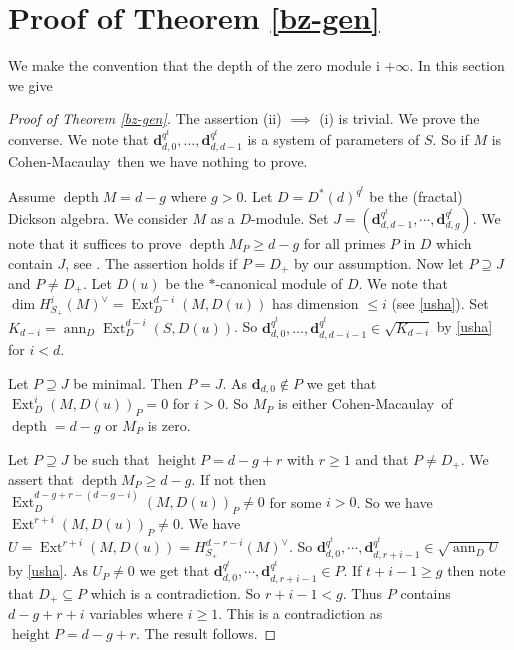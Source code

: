 \documentclass{amsart}
\newcommand{\CM}{Cohen-Macaulay}
\newcommand{\db}{\mathbf{d} }
\newcommand{\depth}{\operatorname{depth}}
\newcommand{\height}{\operatorname{height}}
\newcommand{\ann}{\operatorname{ann}}
\newcommand{\Ext}{\operatorname{Ext}}
\theoremstyle{plain}
\theoremstyle{definition}
\theoremstyle{remark}
\begin{document}
\section{Proof of Theorem \ref{bz-gen}}
We make the convention that the depth of the zero module i $+ \infty$.
In this section we give
\begin{proof}[Proof of Theorem \ref{bz-gen}]
The assertion (ii) $\implies $ (i) is trivial. We prove the converse.
We note that $\db_{d,0}^{q^t},\ldots, \db_{d, d-1}^{q^t}$ is a system of parameters of $S$. So if $M$ is \CM \ then
we have nothing to prove.

Assume $\depth M = d-g$ where $g > 0$. Let $D = D^*(d)^{q^t}$ be the (fractal) Dickson algebra. We consider $M$ as a $D$-module. Set $J =  (\db_{d,d-1}^{q^t}, \cdots, \db_{d,g}^{q^t})$. We note that it suffices to prove $\depth M_P \geq d -g$ for all primes $P$ in $D$ which contain $J$, see \cite[1.2.10]{BH}. The assertion holds if $P = D_+$ by our assumption. Now let $P \supseteq J$ and $P \neq D_+$. Let $D(u)$ be the $*$-canonical module of $D$.
We note that $\dim H^{i}_{S_+}(M)^\vee = \Ext^{d-i}_D(M, D(u))$ has dimension $\leq i$
 (see \ref{usha}).  Set $K_{d-i} = \ann_D \Ext^{d-i}_D(S, D(u))$. So
 $\db_{d,0}^{q^t}, \ldots, \db_{d, d-i-1}^{q^t} \in \sqrt{K_{d-i}}$ by \ref{usha} for $i < d$.

  Let $P \supseteq J$ be minimal. Then $P = J$. As $\db_{d, 0} \notin P$ we get that\\
  $\Ext^{i}_D(M, D(u))_P = 0$ for $i > 0$. So $M_P$ is either \CM \ of $\depth  = d -g$ or $M_P$ is  zero.

  Let $P \supseteq J$ be such that $\height P = d - g + r$ with $r \geq 1$ and that $P \neq D_+$. We assert that $\depth M_P \geq d- g$. If not then $\Ext^{d-g + r -(d -g -i)}_D(M, D(u))_P \neq 0$ for some $i > 0$. So we have $\Ext^{r+i}(M, D(u))_P \neq 0$. We have $U = \Ext^{r+i}(M, D(u)) = H^{d - r - i}_{S_+}(M)^\vee$. So $\db_{d,0}^{q^t}, \cdots, \db_{d, r + i -1}^{q^t} \in \sqrt{\ann_D U}$ by  \ref{usha}. As $U_P \neq 0$ we get that $\db_{d,0}^{q^t}, \cdots, \db_{d, r + i -1}^{q^t} \in P$. If $t+i -1 \geq g$ then note that $D_+ \subseteq P$ which is a contradiction. So  $r + i -1 < g$.
  Thus  $P$ contains $d - g + r + i$ variables where $i \geq 1$. This is a contradiction as $\height P = d - g + r$. The result follows.
\end{proof}
\end{document}
